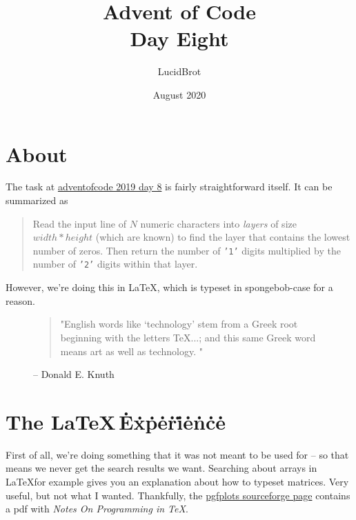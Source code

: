 \documentclass{article} \usepackage[utf8]{inputenc}
\title{Advent of Code\\
{\large Day Eight}}
\author{LucidBrot} \date{August 2020}
\begin{document}
\maketitle

\section{About}
The task at \href{https://adventofcode.com/2019/day/8}{adventofcode 2019 day 8} is fairly straightforward itself. It can be summarized as \begin{myquote}\begin{quote}
Read the input line of $N$ numeric characters into \textit{layers} of size $width * height$ (which are known) to find the layer that contains the lowest number of zeros. Then return the number of \texttt{'1'} digits multiplied by the number of \texttt{'2'} digits within that layer.
\end{quote}\end{myquote}

However, we're doing this in \LaTeX , which is typeset in spongebob-case for a reason.

\begin{figure}[ht]
\begin{myquote}
\begin{quote}
"English words like ‘technology’ stem from a Greek root beginning with the letters
\TeX ...; and this same Greek word means art as well as technology. "
\end{quote}
\end{myquote}
\caption{-- Donald E. Knuth }
\end{figure}

\section{The \LaTeX\,\.E\.x\.p\.e\.r\.i\.e\.n\.c\.e}
First of all, we're doing something that it was not meant to be used for -- so that means we never get the search results we want. Searching about arrays in \LaTeX for example gives you an explanation about how to typeset matrices. Very useful, but not what I wanted. Thankfully, the \href{http://pgfplots.sourceforge.net/TeX-programming-notes.pdf}{pgfplots sourceforge page} contains a pdf with \textit{Notes On Programming in \TeX}.
\end{document}
